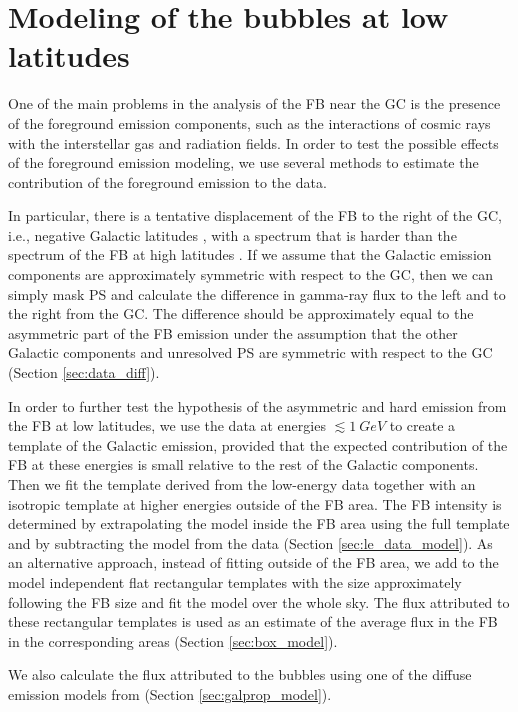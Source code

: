\section{Modeling of the \Fermi bubbles at low latitudes}
\label{sec:Modeling}
One of the main problems in the analysis of the FB near the GC is the 
presence of the foreground emission components, 
such as the interactions of cosmic rays with the interstellar gas and radiation fields.
In order to test the possible effects of the foreground emission modeling,
we use several methods to estimate the contribution of the foreground emission to the data.

In particular, there is a tentative
displacement of the FB to the right of the GC, i.e., negative Galactic latitudes \citep{2016ApJS..223...26A, 2017ApJ...840...43A},
with a spectrum that is harder than the spectrum of the FB at high latitudes \citep{2017ApJ...840...43A}.
If we assume that the Galactic emission components are approximately symmetric with respect to the GC,
then we can simply mask PS and calculate the difference in gamma-ray flux to the left and to the right from the GC.
The difference should be approximately equal to the asymmetric part of the FB emission
under the assumption that the other Galactic components and unresolved PS are symmetric with respect to the GC
(Section \ref{sec:data_diff}).

In order to further test the hypothesis of the asymmetric and hard emission from the FB at low latitudes,
we use the data at energies $\lesssim \SI{1}{GeV}$ to create a template of the Galactic emission,
provided that the expected contribution of the FB at these energies is small relative to the rest of the Galactic components.
Then we fit the template derived from the low-energy data together with an isotropic template at higher energies
outside of the FB area.
The FB intensity is determined by extrapolating the model inside the FB area using the full template and by subtracting the model
from the data (Section \ref{sec:le_data_model}).
As an alternative approach, instead of fitting outside of the FB area, we add to the model independent flat rectangular templates with the size
approximately following the FB size and fit the model over the whole sky.
The flux attributed to these rectangular templates is used as an estimate of the average flux in the FB in the corresponding areas
(Section \ref{sec:box_model}).

We also calculate the flux attributed to the bubbles using one of the diffuse emission models from \citep{2017ApJ...840...43A}
(Section \ref{sec:galprop_model}).



